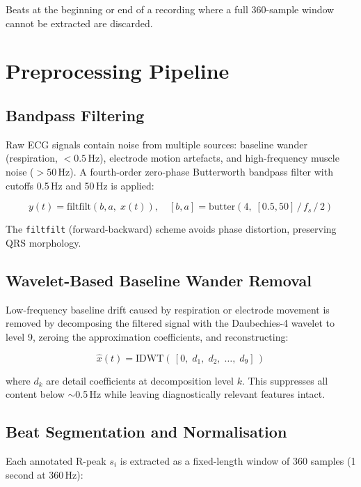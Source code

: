 \documentclass[conference]{IEEEtran}
\begin{document}
Beats at the beginning or end of a recording where a full 360-sample window cannot be extracted are discarded.

\section{Preprocessing Pipeline}

\subsection{Bandpass Filtering}

Raw ECG signals contain noise from multiple sources: baseline wander (respiration, ${<}0.5$\,Hz), electrode motion artefacts, and high-frequency muscle noise (${>}50$\,Hz). A fourth-order zero-phase Butterworth bandpass filter with cutoffs 0.5\,Hz and 50\,Hz is applied:

\begin{equation}
y(t) = \text{filtfilt}(b, a,\; x(t)), \quad [b, a] = \text{butter}(4,\; [0.5, 50]\,/\,f_s\,/\,2)
\end{equation}

The \texttt{filtfilt} (forward-backward) scheme avoids phase distortion, preserving QRS morphology.

\subsection{Wavelet-Based Baseline Wander Removal}

Low-frequency baseline drift caused by respiration or electrode movement is removed by decomposing the filtered signal with the Daubechies-4 wavelet to level 9, zeroing the approximation coefficients, and reconstructing:

\begin{equation}
\hat{x}(t) = \text{IDWT}(\,[0,\; d_1,\; d_2,\; \ldots,\; d_9]\,)
\end{equation}

where $d_k$ are detail coefficients at decomposition level $k$. This suppresses all content below $\sim$0.5\,Hz while leaving diagnostically relevant features intact.

\subsection{Beat Segmentation and Normalisation}

Each annotated R-peak $s_i$ is extracted as a fixed-length window of 360 samples (1 second at 360\,Hz):
\end{document}
